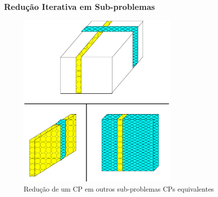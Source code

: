 \begin{frame}[fragile]

\frametitle{Redução Iterativa em Sub-problemas}

\begin{figure}[!htb]

\begin{center}
\includegraphics[width=0.70\textwidth, height=0.60\textheight]{figures/reducao_PR_02.pdf}
\caption{Redução de um CP em outros sub-problemas CPs equivalentes}
\end{center}
\end{figure}

    
\end{frame}


